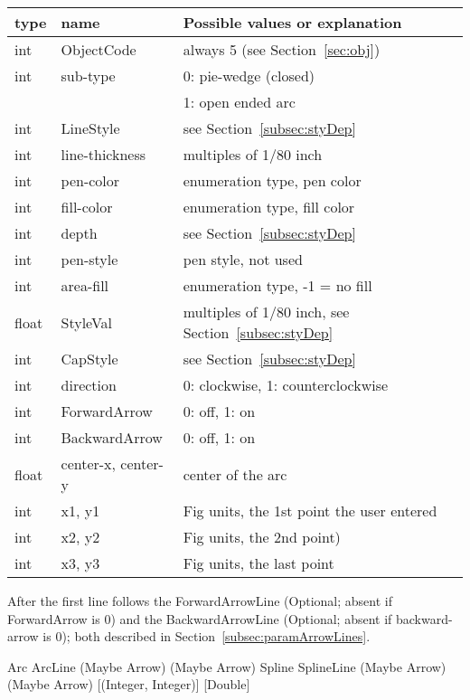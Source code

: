 \documentclass[10pt, a4paper]{article}
\begin{document}
\begin{tabular}{|lll|}
\hline
type & name & Possible values or explanation \\
\hline
\hline
int    & ObjectCode            & always 5 (see Section~\ref{sec:obj}) \\
int    & sub-type               & 0: pie-wedge (closed) \\
&&                                1: open ended arc \\
int    & LineStyle             & see Section~\ref{subsec:styDep} \\
int    & line-thickness         & multiples of 1/80 inch \\
int    & pen-color              & enumeration type, pen color \\
int    & fill-color             & enumeration type, fill color \\
int    & depth                  & see Section~\ref{subsec:styDep} \\
int    & pen-style              & pen style, not used \\
int    & area-fill              & enumeration type, -1 = no fill \\%
float  & StyleVal              & multiples of 1/80 inch, see Section~\ref{subsec:styDep} \\
int    & CapStyle              & see Section~\ref{subsec:styDep} \\
int    & direction              & 0: clockwise, 1: counterclockwise \\
int    & ForwardArrow          & 0: off, 1: on \\
int    & BackwardArrow         & 0: off, 1: on \\
float  & center-x, center-y     & center of the arc \\
int    & x1, y1                 & Fig units, the 1st point the user entered \\
int    & x2, y2                 & Fig units, the 2nd point) \\
int    & x3, y3                 & Fig units, the last point \\
\hline
\end{tabular}

After the first line follows the ForwardArrowLine 
(Optional; absent if ForwardArrow is 0) and 
the BackwardArrowLine (Optional; absent if backward-arrow is 0); 
both described in Section~\ref{subsec:paramArrowLines}. 



Arc ArcLine (Maybe Arrow) (Maybe Arrow)	 
Spline SplineLine (Maybe Arrow) (Maybe Arrow) [(Integer, Integer)] [Double]
\end{document}

